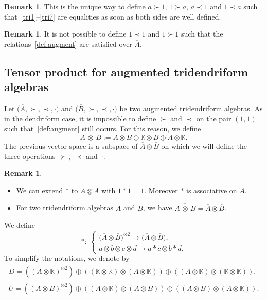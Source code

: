\documentclass[10pt,a4paper]{amsart}
\numberwithin{equation}{section}
\theoremstyle{definition}
\newtheorem{Rq}[defi]{Remark}
\theoremstyle{plain}
\newcommand{\K}{\mathbb{K}}
\begin{document}
\begin{Rq}
	This is the unique way to define $a\succ 1$, $1\succ a$, $a\prec 1$ and $1\prec a$ such that~\eqref{tri1}--\eqref{tri7} are equalities as soon as both sides are well defined.
\end{Rq}
\begin{Rq}
	It is not possible to define $1\prec 1$ and $1\succ 1$ such that the relations~\eqref{def:augment} are satisfied over $\overline{A}.$
\end{Rq}

\subsection{Tensor product for augmented tridendriform algebras}

Let $\big(\overline{A},\succ,\prec,\cdot\big)$ and $\big(\overline{B},\succ,\prec,\cdot\big)$ be two augmented tridendriform algebras. As in the dendriform case, it is impossible to define $\succ$ and $\prec$ on the pair $(1,1)$ such that~\eqref{def:augment} still occurs. For this reason, we define
\[
A\,\overline{\otimes}\, B:=A\otimes B\oplus \K\otimes B \oplus A\otimes \K.
\]
The previous vector space is a subspace of $\overline{A}\otimes \overline{B}$ on which we will define the three opera\-tions~$\succ$,~$\prec$ and~$\cdot$.
\begin{Rq}\qquad
	\begin{itemize}\itemsep=0pt
		\item We can extend $*$ to $\overline{A}\otimes \overline{A}$ with $1*1=1$. Moreover $*$ is associative on $\overline{A}$.
		\item For two tridendriform algebras $A$ and $B$, we have $\overline{A\,\overline{\otimes}\, B}=\overline{A}\otimes \overline{B}$.
	\end{itemize}
\end{Rq}
We define
\begin{equation*}
	*\colon \ \begin{cases}
	\big(\overline{A}\otimes \overline{B}\big)^{\otimes 2} \rightarrow \big(\overline{A}\otimes \overline{B}\big), \\
	a\otimes b\otimes c\otimes d \mapsto a*c\otimes b*d.
	\end{cases}
\end{equation*}
To simplify the notations, we denote by
\begin{gather*}
	D=\left((A\otimes \K)^{\otimes 2}\right)\oplus\left((\K \otimes \K)\otimes (A\otimes \K)\right)\oplus \left((A\otimes \K)\otimes (\K\otimes \K)\right), \\
	 U= \left((A\otimes B)^{\otimes 2}\right)\oplus \left((A\otimes \K)\otimes (A\otimes B)\right)\oplus \left((A\otimes B)\otimes (A\otimes \K)\right).
\end{gather*}
\end{document}
